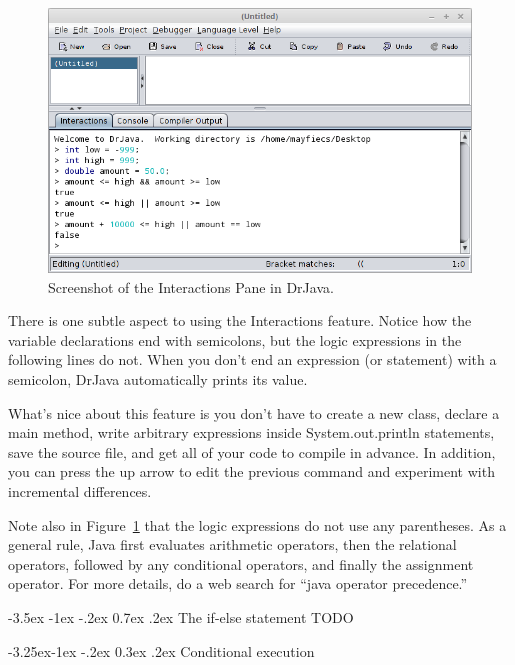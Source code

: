 \documentclass[12pt]{book}
\makeatletter
\renewcommand{\section}{\@startsection {section}{1}{\z@}%
    {-3.5ex \@plus -1ex \@minus -.2ex}%
    {0.7ex \@plus.2ex}%
    {\normalfont\Large\bfseries}}
\renewcommand\subsection{\@startsection{subsection}{2}{\z@}%
    {-3.25ex\@plus -1ex \@minus -.2ex}%
    {0.3ex \@plus .2ex}%
    {\normalfont\large\bfseries}}
\theoremstyle{exercise}
\makeatother
\begin{document}
\begin{figure}[!h]
\begin{center}
\includegraphics[width=\textwidth]{figs/drjava-logic.png}
\caption{Screenshot of the Interactions Pane in DrJava.}
\label{fig:drjava}
\end{center}
\end{figure}

There is one subtle aspect to using the Interactions feature.
Notice how the variable declarations end with semicolons, but the logic expressions in the following lines do not.
When you don't end an expression (or statement) with a semicolon, DrJava automatically prints its value.

What's nice about this feature is you don't have to create a new class, declare a main method, write arbitrary expressions inside System.out.println statements, save the source file, and get all of your code to compile in advance.
In addition, you can press the up arrow to edit the previous command and experiment with incremental differences.


Note also in Figure~\ref{fig:drjava} that the logic expressions do not use any parentheses.
As a general rule, Java first evaluates arithmetic operators, then the relational operators, followed by any conditional operators, and finally the assignment operator.
For more details, do a web search for ``java operator precedence.''


\section{The if-else statement}
TODO

\subsection{Conditional execution}
\end{document}
